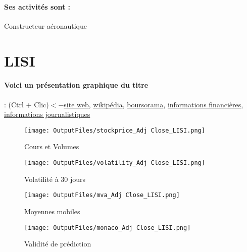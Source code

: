 \documentclass[11pt,a4paper]{report}%
\begin{document}
\paragraph{Ses activités sont : } Constructeur aéronautique 
    
    \newpage

\section{LISI}

\paragraph{Voici un présentation graphique du titre} : (Ctrl + Clic)$<-$\href{https://www.lisi-aerospace.com/fr/investisseurs/}{site web}, \href{https://fr.wikipedia.org/wiki/Lisi_(entreprise)}{wikipédia}, \href{https://www.boursorama.com/cours/1rPFII}{boursorama}, \href{https://www.qwant.com/?q=site:https:%2f%2fwww.easybourse.com%2faction-societe%2fLISI&t=web&client=ext-firefox-hp}{informations financières}, \href{https://bourse.lerevenu.com/cours-de-bourse/fiche-valeur-synthese/LISI/FII-FR}{informations journalistiques}
\begin{figure}[!htb]
   \begin{minipage}{0.5\textwidth}
     \centering
     \texttt{[image: OutputFiles/stockprice\_Adj Close\_LISI.png]}
     \caption{Cours et Volumes}\label{Fig:price_LISI}
   \end{minipage}\hfill
   \begin{minipage}{0.5\textwidth}
     \centering
     \texttt{[image: OutputFiles/volatility\_Adj Close\_LISI.png]}
     \caption{Volatilité à 30 jours}\label{Fig:volat_LISI}
   \end{minipage}
\end{figure}
\begin{figure}[!htb]
   \begin{minipage}{0.5\textwidth}
     \centering
     \texttt{[image: OutputFiles/mva\_Adj Close\_LISI.png]}
     \caption{Moyennes mobiles}\label{Fig:mva_LISI}
   \end{minipage}\hfill
   \begin{minipage}{0.5\textwidth}
     \centering
     \texttt{[image: OutputFiles/monaco\_Adj Close\_LISI.png]}
     \caption{Validité de prédiction}\label{Fig:prediction_LISI}
   \end{minipage}
\end{figure}
\end{document}
